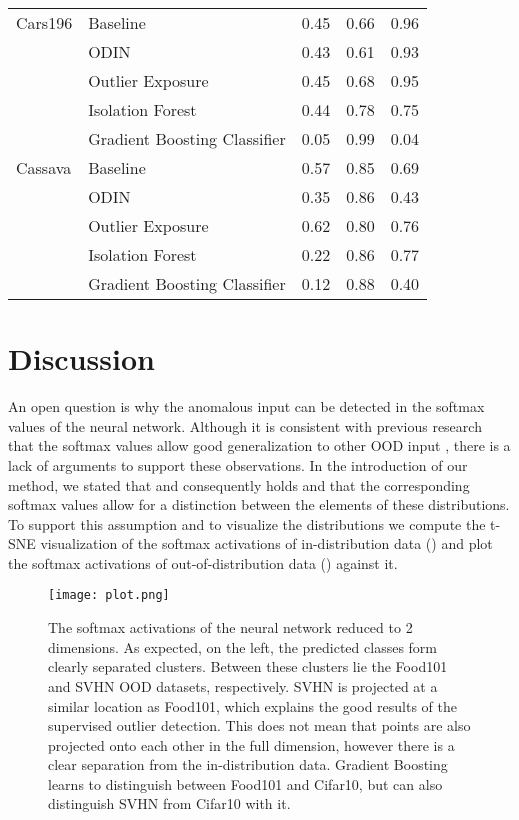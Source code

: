 \documentclass{article}
\begin{document}
\begin{table}
\begin{tabular}{llrrr}
Cars196 & Baseline &                        0.45 &    0.66 &           0.96 \\
        & ODIN &                        0.43 &    0.61 &           0.93 \\
        & Outlier Exposure &                        0.45 &    0.68 &           0.95 \\
        & Isolation Forest &                        0.44 &    0.78 &           0.75 \\
        & Gradient Boosting Classifier &                        0.05 &    0.99 &           0.04 \\
Cassava & Baseline &                        0.57 &    0.85 &           0.69 \\
        & ODIN &                        0.35 &    0.86 &           0.43 \\
        & Outlier Exposure &                        0.62 &    0.80 &           0.76 \\
        & Isolation Forest &                        0.22 &    0.86 &           0.77 \\
        & Gradient Boosting Classifier &                        0.12 &    0.88 &           0.40 \\
\bottomrule
\end{tabular}
\end{table}
 
\section{Discussion}

An open question is why the anomalous input can be detected in the softmax values of the neural network. Although it is consistent with previous research that the softmax values allow good generalization to other OOD input \cite{Hendrycks.2018, Ruff.30.05.2020}, there is a lack of arguments to support these observations. In the introduction of our method, we stated that  and consequently  holds and that the corresponding softmax values allow for a distinction between the elements of these distributions. To support this assumption and to visualize the distributions we compute the t-SNE visualization of the softmax activations of in-distribution data () and plot the softmax activations of out-of-distribution data () against it.

\begin{figure*}
\label{outputDist}
\centering
\texttt{[image: plot.png]}
\caption{The softmax activations of the neural network reduced to 2 dimensions. As expected, on the left, the predicted classes form clearly separated clusters. Between these clusters lie the Food101 and SVHN OOD datasets, respectively. SVHN is projected at a similar location as Food101, which explains the good results of the supervised outlier detection. This does not mean that points are also projected onto each other in the full dimension, however there is a clear separation from the in-distribution data. Gradient Boosting learns to distinguish between Food101 and Cifar10, but can also distinguish SVHN from Cifar10 with it.}
\end{figure*}
\end{document}
